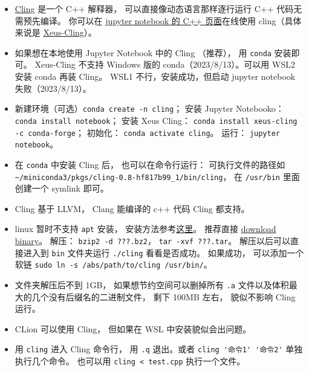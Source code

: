 
\begin{issues}
\issueDraft
\end{issues}


\begin{itemize}
\item \href{https://root.cern/cling/}{Cling} 是一个 C++ 解释器， 可以直接像动态语言那样逐行运行 C++ 代码无需预先编译。
你可以在 \href{https://jupyter.org/try}{jupyter notebook 的 C++ 页面}在线使用 cling（具体来说是 \href{https://xeus-cling.readthedocs.io/en/latest/index.html}{Xeus-Cling}）。
\item 如果想在本地使用 Jupyter Notebook 中的 Cling （推荐）， 用 \verb|conda| 安装即可。 Xeus-Cling 不支持 Windows 版的 conda（2023/8/13）。可以用 WSL2 安装 conda 再装 Cling。 WSL1 不行，安装成功，但启动 jupyter notebook 失败（2023/8/13）。
\item 新建环境（可选）\verb|conda create -n cling|； 安装 Jupyter Notebooko：\verb|conda install notebook|； 安装 Xeus Cling： \verb|conda install xeus-cling -c conda-forge|； 初始化： \verb|conda activate cling|。 运行： \verb|jupyter notebook|。
\item 在 \verb|conda| 中安装 Cling 后， 也可以在命令行运行： 可执行文件的路径如 \verb|~/miniconda3/pkgs/cling-0.8-hf817b99_1/bin/cling|， 在 \verb|/usr/bin| 里面创建一个 symlink 即可。
\item Cling 基于 LLVM， Clang 能编译的 c++ 代码 Cling 都支持。
\item linux 暂时不支持 \verb|apt| 安装， 安装方法参考\href{https://kaustubh13.medium.com/how-to-install-cling-on-linux-or-wsl-8125798ed9b9}{这里}。 推荐直接 \href{https://root.cern/download/cling/}{download binary}。 解压： \verb|bzip2 -d ???.bz2|， \verb|tar -xvf ???.tar|。 解压以后可以直接进入到 \verb|bin| 文件夹运行 \verb|./cling| 看看是否成功。 如果成功， 可以添加一个软链 \verb|sudo ln -s /abs/path/to/cling /usr/bin/|。
\item 文件夹解压后不到 1GB， 如果想节约空间可以删掉所有 \verb|.a| 文件以及体积最大的几个没有后缀名的二进制文件， 剩下 100MB 左右， 貌似不影响 Cling 运行。
\item CLion 可以使用 Cling， 但如果在 WSL 中安装貌似会出问题。
\item 用 \verb|cling| 进入 Cling 命令行， 用 \verb|.q| 退出。或者 \verb|cling '命令1' '命令2'| 单独执行几个命令。 也可以用 \verb|cling < test.cpp| 执行一个文件。

\end{itemize}
